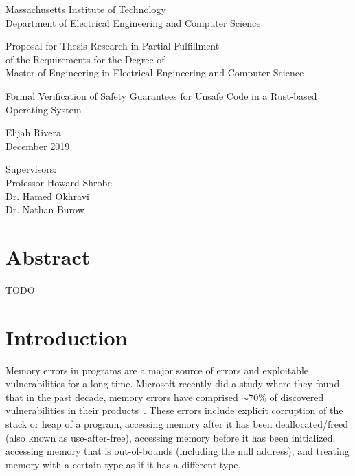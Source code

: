 \documentclass[12pt]{article}
\begin{document}
\begin{titlepage}
   \begin{center}
       \vspace*{1cm}
       Massachusetts Institute of Technology \\
       Department of Electrical Engineering and Computer Science
 
       \vspace{1cm}
       Proposal for Thesis Research in Partial Fulfillment \\
       of the Requirements for the Degree of \\
       Master of Engineering in Electrical Engineering and Computer Science
 
       \vspace{1cm}
 
       Formal Verification of Safety Guarantees for Unsafe Code in a Rust-based Operating System
 
       \vspace{1cm}
       Elijah Rivera \\
       December 2019
 
       \vspace{1cm}
        Supervisors: \\ Professor Howard Shrobe \\
        Dr. Hamed Okhravi \\
        Dr. Nathan Burow
   \end{center}
\end{titlepage}

\section*{Abstract}
TODO

\section{Introduction}

Memory errors in programs are a major source of errors and exploitable vulnerabilities for a long time. Microsoft recently did a study where they found that in the past decade, memory errors have comprised $\sim70\%$ of discovered vulnerabilities in their products~\cite{microsoft_study}. These errors include explicit corruption of the stack or heap of a program, accessing memory after it has been deallocated/freed (also known as use-after-free), accessing memory before it has been initialized, accessing memory that is out-of-bounds (including the null address), and treating memory with a certain type as if it has a different type.
\end{document}
